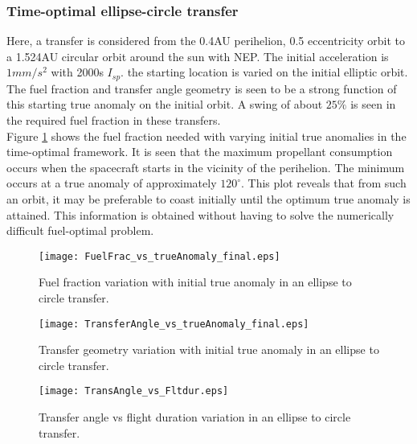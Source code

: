 \subsubsection{Time-optimal ellipse-circle transfer}
Here, a transfer is considered from the 0.4AU perihelion, 0.5 eccentricity orbit to a 1.524AU circular orbit around the sun with NEP. The initial acceleration is $1mm/s^2$ with 2000s $I_{sp}$. the starting location is varied on the initial elliptic orbit. The fuel fraction and transfer angle geometry is seen to be a strong function of this starting true anomaly on the initial orbit. A swing of about $25\%$ is seen in the required fuel fraction in these transfers.\\
Figure \ref{ellipse-to-circ_fuel} shows the fuel fraction needed with varying initial true anomalies in the time-optimal framework. It is seen that the maximum propellant consumption occurs when the spacecraft starts in the vicinity of the perihelion. The minimum occurs at a true anomaly of approximately $120^\circ$. This plot reveals that from such an orbit, it may be preferable to coast initially until the optimum true anomaly is attained. This information is obtained without having to solve the numerically difficult fuel-optimal problem.
\begin{figure}[H]
	\centering\texttt{[image: FuelFrac\_vs\_trueAnomaly\_final.eps]}
	\caption{Fuel fraction variation with initial true anomaly in an ellipse to circle transfer.}
	\label{ellipse-to-circ_fuel}
\end{figure}
\begin{figure}[H]
	\centering\texttt{[image: TransferAngle\_vs\_trueAnomaly\_final.eps]}
	\caption{Transfer geometry variation with initial true anomaly in an ellipse to circle transfer.}
	\label{ellipse-to-circ_trantime}
\end{figure}
\begin{figure}[H]
	\centering\texttt{[image: TransAngle\_vs\_Fltdur.eps]}
	\caption{Transfer angle vs flight duration variation in an ellipse to circle transfer.}
	\label{ellipse-to-circ_trangle_trantime}
\end{figure}
